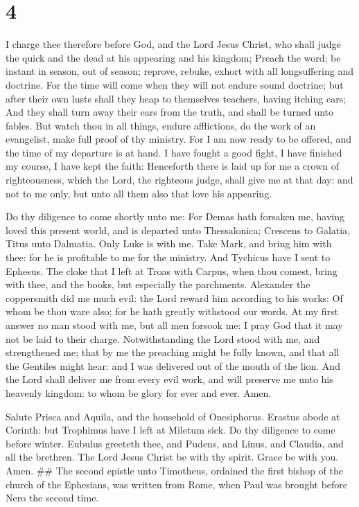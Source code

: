 \hypertarget{section-3}{%
\section{4}\label{section-3}}

 I charge thee therefore before God, and the Lord Jesus
Christ, who shall judge the quick and the dead at his appearing and his
kingdom;  Preach the word; be instant in season, out of
season; reprove, rebuke, exhort with all longsuffering and doctrine.
 For the time will come when they will not endure sound
doctrine; but after their own lusts shall they heap to themselves
teachers, having itching ears;  And they shall turn away
their ears from the truth, and shall be turned unto fables.
 But watch thou in all things, endure afflictions, do the
work of an evangelist, make full proof of thy ministry. 
For I am now ready to be offered, and the time of my departure is at
hand.  I have fought a good fight, I have finished my
course, I have kept the faith:  Henceforth there is laid
up for me a crown of righteousness, which the Lord, the righteous judge,
shall give me at that day: and not to me only, but unto all them also
that love his appearing.

 Do thy diligence to come shortly unto me: 
For Demas hath forsaken me, having loved this present world, and is
departed unto Thessalonica; Crescens to Galatia, Titus unto Dalmatia.
 Only Luke is with me. Take Mark, and bring him with
thee: for he is profitable to me for the ministry.  And
Tychicus have I sent to Ephesus.  The cloke that I left
at Troas with Carpus, when thou comest, bring with thee, and the books,
but especially the parchments.  Alexander the coppersmith
did me much evil: the Lord reward him according to his works:
 Of whom be thou ware also; for he hath greatly withstood
our words.  At my first answer no man stood with me, but
all men forsook me: I pray God that it may not be laid to their charge.
 Notwithstanding the Lord stood with me, and strengthened
me; that by me the preaching might be fully known, and that all the
Gentiles might hear: and I was delivered out of the mouth of the lion.
 And the Lord shall deliver me from every evil work, and
will preserve me unto his heavenly kingdom: to whom be glory for ever
and ever. Amen.

 Salute Prisca and Aquila, and the household of
Onesiphorus.  Erastus abode at Corinth: but Trophimus
have I left at Miletum sick.  Do thy diligence to come
before winter. Eubulus greeteth thee, and Pudens, and Linus, and
Claudia, and all the brethren.  The Lord Jesus Christ be
with thy spirit. Grace be with you. Amen. \#\# The second epistle unto
Timotheus, ordained the first bishop of the church of the Ephesians, was
written from Rome, when Paul was brought before Nero the second time.
